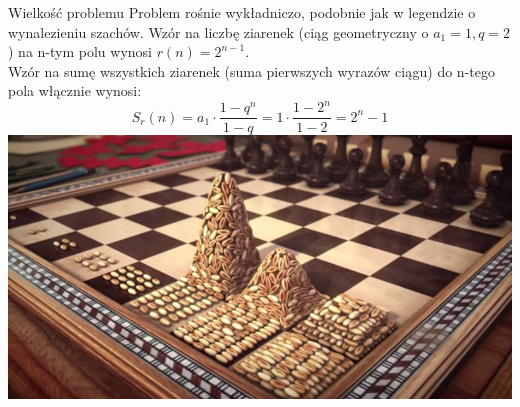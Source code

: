 \begin{frame}{Wielkość problemu}
    Problem rośnie wykładniczo, podobnie jak w legendzie o wynalezieniu szachów. Wzór na liczbę ziarenek (ciąg geometryczny o $a_1=1, q=2$) na n-tym polu wynosi $r(n) = 2^{n-1}$. \\
    Wzór na sumę wszystkich ziarenek (suma pierwszych wyrazów ciągu) do n-tego pola włącznie wynosi:
    \[ S_r(n) = a_1 \cdot \frac{1-q^n}{1-q} = 1 \cdot \frac{1-2^n}{1-2} = 2^n - 1 \]
    \centering
    \includegraphics[height=0.35\textheight]{graphics/recursion/chessboard1.png}
\end{frame}
